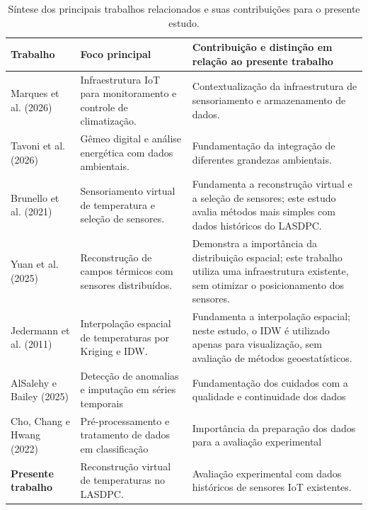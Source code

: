 \begin{table}[htbp]
    \centering
    \caption{Síntese dos principais trabalhos relacionados e suas contribuições para o presente estudo.}
    \label{tab:comparacao_trabalhos}
    \small
    \renewcommand{\arraystretch}{1.3}
    \begin{tabularx}{\textwidth}{
        >{\raggedright\arraybackslash}p{3.0cm}
        >{\raggedright\arraybackslash}X
        >{\raggedright\arraybackslash}X
    }
        \hline
        \textbf{Trabalho} &
        \textbf{Foco principal} &
        \textbf{Contribuição e distinção em relação ao presente trabalho} \\
        \hline
        Marques et al. (2026) &
        Infraestrutura IoT para monitoramento e controle de climatização. &
        Contextualização da infraestrutura de sensoriamento e armazenamento de dados. \\
        Tavoni et al. (2026) &
        Gêmeo digital e análise energética com dados ambientais. &
        Fundamentação da integração de diferentes grandezas ambientais. \\
        Brunello et al. (2021) &
        Sensoriamento virtual de temperatura e seleção de sensores. &
        Fundamenta a reconstrução virtual e a seleção de sensores; este estudo avalia métodos mais simples com dados históricos do LASDPC. \\
        Yuan et al. (2025) &
        Reconstrução de campos térmicos com sensores distribuídos. &
        Demonstra a importância da distribuição espacial; este trabalho utiliza uma infraestrutura existente, sem otimizar o posicionamento dos sensores. \\
        Jedermann et al. (2011) &
        Interpolação espacial de temperaturas por Kriging e IDW. &
        Fundamenta a interpolação espacial; neste estudo, o IDW é utilizado apenas para visualização, sem avaliação de métodos geoestatísticos. \\
        AlSalehy e Bailey (2025) & Detecção de anomalias e imputação em séries temporais & Fundamentação dos cuidados com a qualidade e continuidade dos dados \\
        Cho, Chang e Hwang (2022) & Pré-processamento e tratamento de dados em classificação & Importância da preparação dos dados para a avaliação experimental \\
        \hline
        \textbf{Presente trabalho} &
        Reconstrução virtual de temperaturas no LASDPC. &
        Avaliação experimental com dados históricos de sensores IoT existentes. \\
        \hline
    \end{tabularx}

    \fautor
\end{table}

